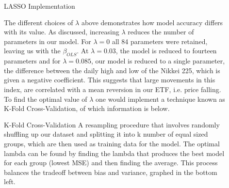 \documentclass[final]{beamer}
\newlength{\sepwid}
\newlength{\onecolwid}
\newlength{\twocolwid}
\begin{document}
\begin{frame}[t]
\begin{columns}[t]
\begin{column}{\twocolwid}
\begin{block}{LASSO Implementation}
\begin{figure}
\end{figure}
The different choices of $\lambda$ above demonstrates how model accuracy differs with its value. As discussed, increasing $\lambda$ reduces the number of parameters in our model. For $\lambda = 0$ all 84 parameters were retained, leaving us with the $\beta_{OLS}$. At $\lambda = 0.03$, the model is reduced to fourteen parameters and for $\lambda = 0.085$, our model is reduced to a single parameter, the difference between the daily high and low of the Nikkei 225, which is given a negative coefficient. This  suggests that large movements in this index, are correlated with a mean reversion in our ETF, i.e. price falling. To find the optimal value of $\lambda$ one would implement a technique known as K-Fold Cross-Validation, of which information is below.

\end{block} 

    \begin{alertblock}{K-Fold Cross-Validation}
        A resampling procedure that involves randomly shuffling up our dataset and splitting it into k number of equal sized groups, which are then used as training data for the model. The optimal lambda can be found by finding the lambda that produces the best model for each group (lowest MSE) and then finding the average. This process balances the tradeoff between bias and variance, graphed in the bottom left.

    \end{alertblock}
\end{column} %

\begin{column}{\sepwid}\end{column} %

\begin{column}{\onecolwid} %

\vspace{-1.25cm}


\end{column}
\end{columns}
\end{frame}
\end{document}
